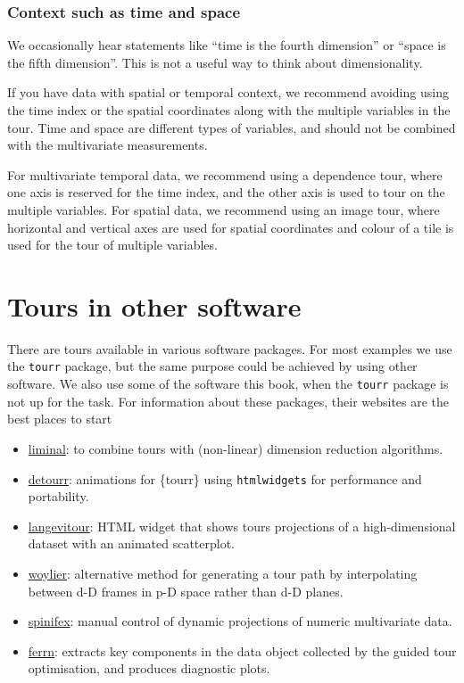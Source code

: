 \documentclass[
  letterpaper,
]{krantz}
\providecommand{\tightlist}{%
  \setlength{\itemsep}{0pt}\setlength{\parskip}{0pt}}
\begin{document}
\subsubsection{Context such as time and
space}\label{context-such-as-time-and-space}

We occasionally hear statements like ``time is the fourth dimension'' or
``space is the fifth dimension''. This is not a useful way to think
about dimensionality.

If you have data with spatial or temporal context, we recommend avoiding
using the time index or the spatial coordinates along with the multiple
variables in the tour. Time and space are different types of variables,
and should not be combined with the multivariate measurements.

For multivariate temporal data, we recommend using a dependence tour,
where one axis is reserved for the time index, and the other axis is
used to tour on the multiple variables. For spatial data, we recommend
using an image tour, where horizontal and vertical axes are used for
spatial coordinates and colour of a tile is used for the tour of
multiple variables.

\section{Tours in other software}\label{tours-in-other-software}

There are tours available in various software packages. For most
examples we use the \texttt{tourr} package, but the same purpose could
be achieved by using other software. We also use some of the software
this book, when the \texttt{tourr} package is not up for the task. For
information about these packages, their websites are the best places to
start

\begin{itemize}
\tightlist
\item
  \href{https://sa-lee.github.io/liminal/}{liminal}: to combine tours
  with (non-linear) dimension reduction algorithms.
\item
  \href{https://casperhart.github.io/detourr/}{detourr}: animations for
  \{tourr\} using \texttt{htmlwidgets} for performance and portability.
\item
  \href{https://logarithmic.net/langevitour/}{langevitour}: HTML widget
  that shows tours projections of a high-dimensional dataset with an
  animated scatterplot.
\item
  \href{https://numbats.github.io/woylier/}{woylier}: alternative method
  for generating a tour path by interpolating between d-D frames in p-D
  space rather than d-D planes.
\item
  \href{https://nspyrison.github.io/spinifex/}{spinifex}: manual control
  of dynamic projections of numeric multivariate data.
\item
  \href{https://huizezhang-sherry.github.io/ferrn/}{ferrn}: extracts key
  components in the data object collected by the guided tour
  optimisation, and produces diagnostic plots.
\end{itemize}
\end{document}
